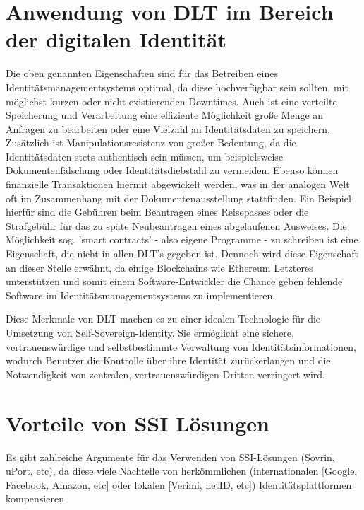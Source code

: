 \section{Anwendung von DLT im Bereich der digitalen Identität}
Die oben genannten Eigenschaften sind für das Betreiben eines Identitätsmanagementsystems optimal, da diese hochverfügbar sein sollten, mit möglichst kurzen oder nicht existierenden Downtimes. Auch ist eine verteilte Speicherung und Verarbeitung eine effiziente Möglichkeit große Menge an Anfragen zu bearbeiten oder eine Vielzahl an Identitätsdaten zu speichern. Zusätzlich ist Manipulationsresistenz von großer Bedeutung, da die Identitätsdaten stets authentisch sein müssen, um beispielsweise Dokumentenfälschung oder Identitätsdiebstahl zu vermeiden. Ebenso können finanzielle Transaktionen hiermit abgewickelt werden, was in der analogen Welt oft im Zusammenhang mit der Dokumentenausstellung stattfinden. Ein Beispiel hierfür sind die Gebühren beim Beantragen eines Reisepasses oder die Strafgebühr für das zu späte Neubeantragen eines abgelaufenen Ausweises.
Die Möglichkeit sog. 'smart contracts' - also eigene Programme - zu schreiben ist eine Eigenschaft, die nicht in allen DLT's gegeben ist. Dennoch wird diese Eigenschaft an dieser Stelle erwähnt, da einige Blockchains wie Ethereum Letzteres unterstützen und somit einem Software-Entwickler die Chance geben fehlende Software im Identitätsmanagementsystems zu implementieren.

Diese Merkmale von DLT machen es zu einer idealen Technologie für die Umsetzung von Self-Sovereign-Identity. Sie ermöglicht eine sichere, vertrauenswürdige und selbstbestimmte Verwaltung von Identitätsinformationen, wodurch Benutzer die Kontrolle über ihre Identität zurückerlangen und die Notwendigkeit von zentralen, vertrauenswürdigen Dritten verringert wird.

\section{Vorteile von SSI Lösungen}
Es gibt zahlreiche Argumente für das Verwenden von SSI-Lösungen (Sovrin, uPort, etc), da diese viele Nachteile von herkömmlichen (internationalen [Google, Facebook, Amazon, etc] oder lokalen [Verimi, netID, etc]) Identitätsplattformen kompensieren \cite{ID28}

